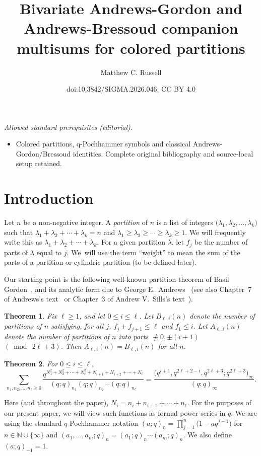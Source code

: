 \documentclass[10pt,a4paper]{amsart}
\title{Bivariate Andrews-Gordon and Andrews-Bressoud companion multisums for colored partitions}
\author{Matthew C. Russell}
\date{doi:10.3842/SIGMA.2026.046; CC BY 4.0}
\numberwithin{equation}{section}
\newtheorem{Theorem}{Theorem}[section]
\theoremstyle{definition}
\newcommand{\NN}{\mathbb{N}}
\begin{document}
\maketitle
\noindent\textit{Allowed standard prerequisites (editorial).}\begin{itemize}
\item Colored partitions, q-Pochhammer symbols and classical Andrews-Gordon/Bressoud identities. Complete original bibliography and source-local setup retained.
\end{itemize}\medskip
\section{Introduction}

Let $n$ be a non-negative integer. A {\it partition} of $n$ is a list of integers $\bigl(\lambda_1,\lambda_2,\dots,\lambda_k\bigr)$ such that $ \lambda_1+\lambda_2+\cdots+\lambda_k = n$ and $\lambda_1 \ge \lambda_2 \ge \cdots \ge \lambda_k \ge 1$. We will frequently write this as $\lambda_1+\lambda_2+\cdots+\lambda_k$. For a given partition $\lambda$, let $f_j$ be the number of parts of $\lambda$ equal to $j$. We~will use the term ``weight'' to mean the sum of the parts of a partition or cylindric partition (to be defined later).

Our starting point is the following well-known partition theorem of Basil Gordon~\cite{Gord}, and its analytic form due to George E.~Andrews~\cite{And66} (see also Chapter~7 of Andrews's text~\cite{And-book} or Chapter~3 of Andrew V.~Sills's text~\cite{Sil-book}).

\begin{Theorem} \label{thm:Gordon}
Fix $\ell\ge 1$, and let $0\le i\le \ell$. Let $B_{\ell,i}(n)$ denote the number of partitions of $n$ satisfying, for all $j$, $f_j + f_{j+1}\le \ell$ and $f_1 \le i$. Let $A_{\ell,i}(n)$ denote the number of partitions of $n$ into parts $\not\equiv 0, \pm (i+1)$ $(\bmod~2\ell+3)$. Then $A_{\ell,i}(n)=B_{\ell,i}(n)$ for all $n$.
\end{Theorem}

\begin{Theorem} \label{thm:AndGor}
For $0\le i \le \ell,$
\begin{equation*}
\sum_{n_1,n_2,\dots,n_{\ell}\ge 0} \frac{q^{N_1^2+N_2^2+\cdots+N_{\ell}^2+N_{i+1}+N_{i+2}+\cdots+N_{\ell}}}{(q;q)_{n_1}(q;q)_{n_2}\cdots(q;q)_{n_{\ell}}} = \frac{\bigl(q^{i+1},q^{2\ell+2-i},q^{2\ell+3};q^{2\ell+3}\bigr)_\infty}{(q;q)_\infty}.
\end{equation*}
\end{Theorem}
Here (and throughout the paper), $N_i = n_i +n_{i+1}+\cdots+n_{\ell}$. For the purposes of our present paper, we will view such functions as formal power series in $q$. We are using the standard $q$-Pochhammer notation
$(a;q)_n = \prod_{j=1}^n \bigl(1-aq^{j-1}\bigr)$ for $n \in \NN \cup \{\infty\}$ and $(a_1,\dots,a_m;q)_n=(a_1;q)_n\cdots(a_m;q)_n$. We also define $(a;q)_{-1}=1$.
\end{document}

